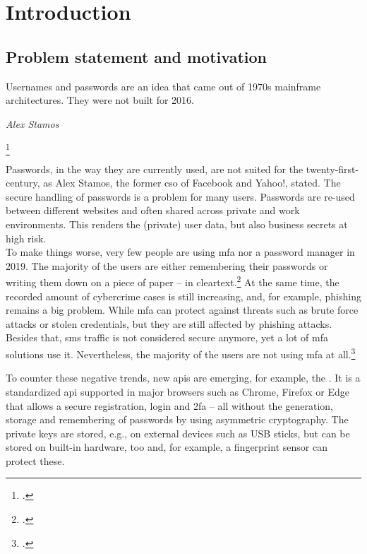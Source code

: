 \chapter{Introduction}
\label{chapter:introduction}

\section{Problem statement and motivation}

\setlength{}
\epigraph{\frqq Usernames and passwords are an idea that came out of 1970s mainframe architectures. They were not built for 2016.\flqq\footnotemark}{\textit{Alex Stamos}}
\footcitetext[See][]{stamos}

Passwords, in the way they are currently used, are not suited for the twenty-first-century, as Alex Stamos, the former \gls{cso} of Facebook and Yahoo!, stated. The secure handling of passwords is a problem for many users. Passwords are re-used between different websites and often shared across private and work environments. This renders the (private) user data, but also business secrets at high risk.\\
To make things worse, very few people are using \gls{mfa} nor a password manager in 2019. The majority of the users are either remembering their passwords or writing them down on a piece of paper -- in cleartext.\footcites[See][]{ibm-security}[See][]{web-de-passwords}
At the same time, the recorded amount of cybercrime cases is still increasing, and, for example, phishing remains a big problem. While \gls{mfa} can protect against threats such as brute force attacks or stolen credentials, but they are still affected by phishing attacks. Besides that, \gls{sms} traffic is not considered secure anymore, yet a lot of \gls{mfa} solutions use it. Nevertheless, the majority of the users are not using \gls{mfa} at all.\footcites[See][]{infratest-dimap}[See][6--7]{bka-cybercrime}

To counter these negative trends, new \glspl{api} are emerging, for example, the \wa. It is a standardized \gls{api} supported in major browsers such as Chrome, Firefox or Edge that allows  a secure registration, login and \gls{2fa} -- all without the generation, storage and remembering of passwords by using asymmetric cryptography. The private keys are stored, e.g., on external devices such as USB sticks, but can be stored on built-in hardware, too and, for example, a fingerprint sensor can protect these.

